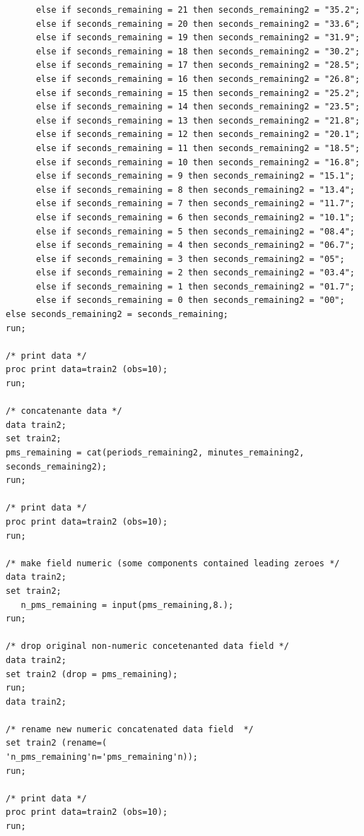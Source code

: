 \begin{verbatim}
	  else if seconds_remaining = 21 then seconds_remaining2 = "35.2";
	  else if seconds_remaining = 20 then seconds_remaining2 = "33.6";
	  else if seconds_remaining = 19 then seconds_remaining2 = "31.9";
	  else if seconds_remaining = 18 then seconds_remaining2 = "30.2";
	  else if seconds_remaining = 17 then seconds_remaining2 = "28.5";
	  else if seconds_remaining = 16 then seconds_remaining2 = "26.8";
	  else if seconds_remaining = 15 then seconds_remaining2 = "25.2";
	  else if seconds_remaining = 14 then seconds_remaining2 = "23.5";
	  else if seconds_remaining = 13 then seconds_remaining2 = "21.8";
	  else if seconds_remaining = 12 then seconds_remaining2 = "20.1";
	  else if seconds_remaining = 11 then seconds_remaining2 = "18.5";
	  else if seconds_remaining = 10 then seconds_remaining2 = "16.8";
	  else if seconds_remaining = 9 then seconds_remaining2 = "15.1";
      else if seconds_remaining = 8 then seconds_remaining2 = "13.4";
	  else if seconds_remaining = 7 then seconds_remaining2 = "11.7";
	  else if seconds_remaining = 6 then seconds_remaining2 = "10.1";
	  else if seconds_remaining = 5 then seconds_remaining2 = "08.4";
	  else if seconds_remaining = 4 then seconds_remaining2 = "06.7";
	  else if seconds_remaining = 3 then seconds_remaining2 = "05";
	  else if seconds_remaining = 2 then seconds_remaining2 = "03.4";
	  else if seconds_remaining = 1 then seconds_remaining2 = "01.7";
	  else if seconds_remaining = 0 then seconds_remaining2 = "00";
else seconds_remaining2 = seconds_remaining;
run;

/* print data */
proc print data=train2 (obs=10);
run;

/* concatenante data */
data train2;
set train2;
pms_remaining = cat(periods_remaining2, minutes_remaining2, seconds_remaining2);
run;

/* print data */
proc print data=train2 (obs=10);
run;

/* make field numeric (some components contained leading zeroes */
data train2;
set train2;
   n_pms_remaining = input(pms_remaining,8.);
run;

/* drop original non-numeric concetenanted data field */
data train2;
set train2 (drop = pms_remaining);
run;
data train2;

/* rename new numeric concatenated data field  */
set train2 (rename=(
'n_pms_remaining'n='pms_remaining'n));
run;

/* print data */
proc print data=train2 (obs=10);
run;






\end{verbatim}
